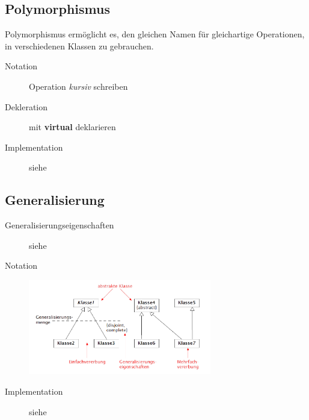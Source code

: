 \subsection{Polymorphismus }
  Polymorphismus ermöglicht es, den gleichen Namen für gleichartige Operationen,
  in verschiedenen Klassen zu gebrauchen.
  \begin{description}
    \item[Notation]
      Operation \textit{kursiv} schreiben
    \item[Dekleration]
      mit \textbf{virtual} deklarieren
    \item[Implementation]
      siehe 
  \end{description}
  
\subsection{Generalisierung }
  \begin{description}
    \item[Generalisierungseigenschaften]
      siehe 
    \item[Notation]
      \parbox{15cm}{\includegraphics[width=8cm]{./images/Notation_Generalisierung.png}}
    \item[Implementation]
      siehe 
  \end{description}
  


